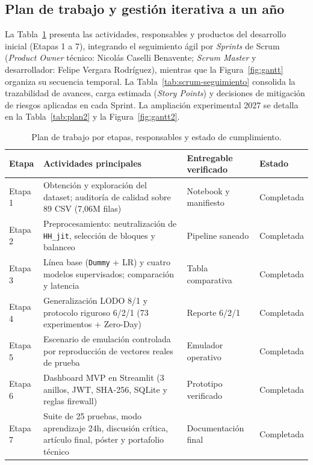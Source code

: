 \documentclass[11pt,a4paper]{article}
\newcommand{\students}{Felipe Vergara Rodríguez}
\newcommand{\advisor}{Nicolás Caselli Benavente}
\begin{document}
\subsection{Plan de trabajo y gestión iterativa a un año}
La Tabla~\ref{tab:plan} presenta las actividades, responsables y productos del desarrollo inicial (Etapas 1 a 7), integrando el seguimiento ágil por \textit{Sprints} de Scrum (\textit{Product Owner} técnico: \advisor{}; \textit{Scrum Master} y desarrollador: \students{}), mientras que la Figura~\ref{fig:gantt} organiza su secuencia temporal. La Tabla~\ref{tab:scrum-seguimiento} consolida la trazabilidad de avances, carga estimada (\textit{Story Points}) y decisiones de mitigación de riesgos aplicadas en cada Sprint. La ampliación experimental 2027 se detalla en la Tabla~\ref{tab:plan2} y la Figura~\ref{fig:gantt2}.

\begin{table}[H]
\centering
\caption{Plan de trabajo por etapas, responsables y estado de cumplimiento.}
\label{tab:plan}
\footnotesize
\begin{tabularx}{\textwidth}{p{1.6cm} X p{3.2cm} p{1.8cm}}
\toprule
\textbf{Etapa} & \textbf{Actividades principales} & \textbf{Entregable verificado} & \textbf{Estado} \\
\midrule
Etapa 1 & Obtención y exploración del dataset; auditoría de calidad sobre 89 CSV (7,06M filas) & Notebook y manifiesto & Completada \\
Etapa 2 & Preprocesamiento: neutralización de \texttt{HH\_jit}, selección de bloques y balanceo & Pipeline saneado & Completada \\
Etapa 3 & Línea base (\texttt{Dummy} + LR) y cuatro modelos supervisados; comparación y latencia & Tabla comparativa & Completada \\
Etapa 4 & Generalización LODO 8/1 y protocolo riguroso 6/2/1 (73 experimentos + Zero-Day) & Reporte 6/2/1 & Completada \\
Etapa 5 & Escenario de emulación controlada por reproducción de vectores reales de prueba & Emulador operativo & Completada \\
Etapa 6 & Dashboard MVP en Streamlit (3 anillos, JWT, SHA-256, SQLite y reglas firewall) & Prototipo verificado & Completada \\
Etapa 7 & Suite de 25 pruebas, modo aprendizaje 24h, discusión crítica, artículo final, póster y portafolio técnico & Documentación final & Completada \\
\bottomrule
\end{tabularx}
\end{table}
\end{document}

